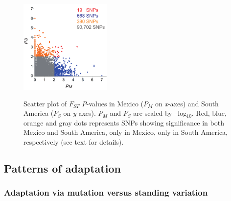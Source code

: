 \begin{figure}[tb]   
  \begin{center}
   \vspace{-0mm}
   \includegraphics[width=0.4\textwidth]{fig/Fig6}
   \renewcommand{\baselinestretch}{0.9}
   \vspace{-3mm}
   \caption{Scatter plot of $F_{ST}$ \emph{P}-values in Mexico ($P_M$ on \emph{x}-axes) and South America ($P_S$ on \emph{y}-axes).  $P_M$ and $P_S$ are scaled by --log$_{10}$.  Red, blue, orange and gray dots represents SNPs showing significance in both Mexico and South America, only in Mexico, only in South America, respectively (see text for details).} 
\vspace{-6mm}
    \label{PvDist}
  \end{center}
\end{figure}
%

\subsection*{Patterns of adaptation}

\subsubsection{Adaptation via mutation versus standing variation}

